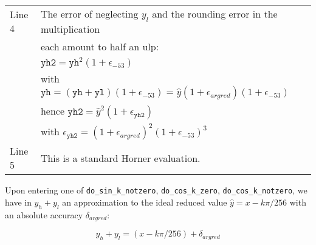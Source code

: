 \begin{tabular}{|ll|}
\hline
Line 4   & The error of neglecting $y_l$ and the rounding error in the multiplication\\
         & each amount to half an ulp: \\
         & $\mathtt{yh2}=\mathtt{yh}^2(1+\epsilon_{-53})$\\
         & with $\mathtt{yh} = (\mathtt{yh}+\mathtt{yl})(1+\epsilon_{-53}) = \hat{y}(1+\epsilon_{argred})(1+\epsilon_{-53})$\\
         & hence $\mathtt{yh2}=\hat{y}^2(1+\epsilon_{\mathtt{yh2}})$ \\
         & with $\epsilon_{\mathtt{yh2}} = (1+\epsilon_{argred})^2(1+\epsilon_{-53})^3$\\
\hline
Line 5   & This is a standard Horner evaluation. \\
\hline
\end{tabular}



Upon entering one of \texttt{do\_sin\_k\_notzero},
\texttt{do\_cos\_k\_zero}, \texttt{do\_cos\_k\_notzero}, we have in
$y_h+y_l$ an approximation to the ideal reduced value
$\hat{y}=x-k\pi/256$ with an absolute accuracy $\delta_{argred}$: 

$$y_h+y_l = (x-k\pi/256) + \delta_{argred} $$

